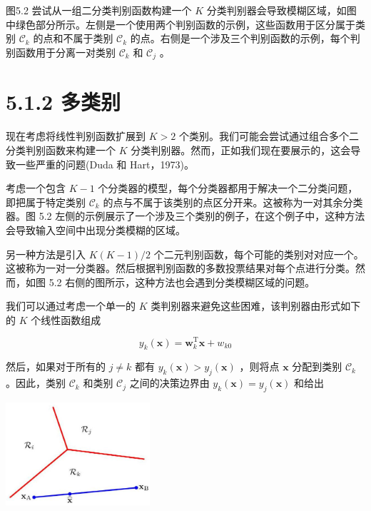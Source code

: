 \documentclass[10pt]{article}
\begin{document}
图5.2 尝试从一组二分类判别函数构建一个 \(K\) 分类判别器会导致模糊区域，如图中绿色部分所示。左侧是一个使用两个判别函数的示例，这些函数用于区分属于类别 \({\mathcal{C}}_{k}\) 的点和不属于类别 \({\mathcal{C}}_{k}\) 的点。右侧是一个涉及三个判别函数的示例，每个判别函数用于分离一对类别 \({\mathcal{C}}_{k}\) 和 \({\mathcal{C}}_{j}\) 。

\section*{5.1.2 多类别}

现在考虑将线性判别函数扩展到 \(K > 2\) 个类别。我们可能会尝试通过组合多个二分类判别函数来构建一个 \(K\) 分类判别器。然而，正如我们现在要展示的，这会导致一些严重的问题(Duda 和 Hart，1973)。

考虑一个包含 \(K - 1\) 个分类器的模型，每个分类器都用于解决一个二分类问题，即把属于特定类别 \({\mathcal{C}}_{k}\) 的点与不属于该类别的点区分开来。这被称为一对其余分类器。图 5.2 左侧的示例展示了一个涉及三个类别的例子，在这个例子中，这种方法会导致输入空间中出现分类模糊的区域。

另一种方法是引入 \(K\left( {K - 1}\right) /2\) 个二元判别函数，每个可能的类别对对应一个。这被称为一对一分类器。然后根据判别函数的多数投票结果对每个点进行分类。然而，如图 5.2 右侧的图所示，这种方法也会遇到分类模糊区域的问题。

我们可以通过考虑一个单一的 \(K\) 类判别器来避免这些困难，该判别器由形式如下的 \(K\) 个线性函数组成

\[
{y}_{k}\left( \mathbf{x}\right)  = {\mathbf{w}}_{k}^{\mathrm{T}}\mathbf{x} + {w}_{k0} \tag{5.7}
\]

然后，如果对于所有的 \(j \neq  k\) 都有 \({y}_{k}\left( \mathbf{x}\right)  > {y}_{j}\left( \mathbf{x}\right)\) ，则将点 \(\mathbf{x}\) 分配到类别 \({\mathcal{C}}_{k}\) 。因此，类别 \({\mathcal{C}}_{k}\) 和类别 \({\mathcal{C}}_{j}\) 之间的决策边界由 \({y}_{k}\left( \mathbf{x}\right)  = {y}_{j}\left( \mathbf{x}\right)\) 和给出

\begin{center}
\includegraphics[max width=0.4\textwidth]{images/0194e279-9b28-703a-88f4-c3ac21e2010d_154_1030_342_518_369_0.jpg}
\end{center}
\hspace*{3em} 
\end{document}
